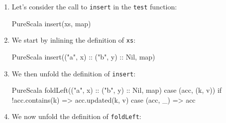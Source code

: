 \documentclass[a4paper,twoside]{article}
\newcommand{\RefSec}[1]{Section~\ref{#1}}
\newcommand{\stt}[1]{\texttt{\small{#1}}}
\begin{document}
\begin{enumerate}

\item Let's consider the call to \stt{insert} in the \stt{test} function:

\begin{ShortCode}{PureScala}
insert(xs, map)
\end{ShortCode}

\item We start by inlining the definition of \stt{xs}:

\begin{ShortCode}{PureScala}
insert(("a", x) :: ("b", y) :: Nil, map)
\end{ShortCode}

\item We then unfold the definition of \stt{insert}:

\begin{ShortCode}{PureScala}
foldLeft(("a", x) :: ("b", y) :: Nil, map) {
  case (acc, (k, v)) if !acc.contains(k) => acc.updated(k, v)
  case (acc, _)                          => acc
}
\end{ShortCode}

\item We now unfold the definition of \stt{foldLeft}:




\end{enumerate}
\end{document}
